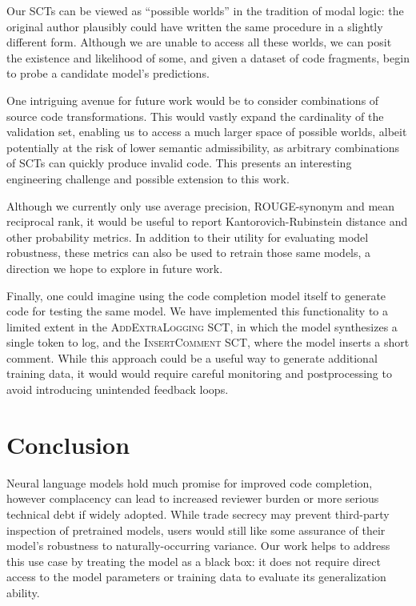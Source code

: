 \documentclass[usenames,dvipsnames]{article} %
\begin{document}
  Our SCTs can be viewed as ``possible worlds'' in the tradition of modal logic: the original author plausibly could have written the same procedure in a slightly different form. Although we are unable to access all these worlds, we can posit the existence and likelihood of some, and given a dataset of code fragments, begin to probe a candidate model's predictions.

  One intriguing avenue for future work would be to consider combinations of source code transformations. This would vastly expand the cardinality of the validation set, enabling us to access a much larger space of possible worlds, albeit potentially at the risk of lower semantic admissibility, as arbitrary combinations of SCTs can quickly produce invalid code. This presents an interesting engineering challenge and possible extension to this work.

  Although we currently only use average precision, ROUGE-synonym and mean reciprocal rank, it would be useful to report Kantorovich-Rubinstein distance and other probability metrics. In addition to their utility for evaluating model robustness, these metrics can also be used to retrain those same models, a direction we hope to explore in future work.

  Finally, one could imagine using the code completion model itself to generate code for testing the same model. We have implemented this functionality to a limited extent in the \textsc{AddExtraLogging} SCT, in which the model synthesizes a single token to log, and the \textsc{InsertComment} SCT, where the model inserts a short comment. While this approach could be a useful way to generate additional training data, it would would require careful monitoring and postprocessing to avoid introducing unintended feedback loops.

  \section{Conclusion}\label{sec:conclusion}

  Neural language models hold much promise for improved code completion, however complacency can lead to increased reviewer burden or more serious technical debt if widely adopted. While trade secrecy may prevent third-party inspection of pretrained models, users would still like some assurance of their model's robustness to naturally-occurring variance. Our work helps to address this use case by treating the model as a black box: it does not require direct access to the model parameters or training data to evaluate its generalization ability.
\end{document}
